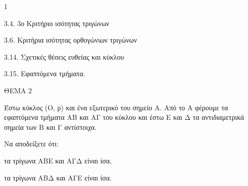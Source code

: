 \begin{ylh}{1}
    \item 3.4. 3ο Κριτήριο ισότητας τριγώνων
    \item 3.6. Κριτήρια ισότητας ορθογώνιων τριγώνων
    \item 3.14. Σχετικές θέσεις ευθείας και κύκλου
    \item 3.15. Εφαπτόμενα τμήματα.
\end{ylh}

ΘΕΜΑ 2

Έστω κύκλος (Ο, ρ) και ένα εξωτερικό του σημείο Α. Από το Α φέρουμε τα εφαπτόμενα τμήματα ΑΒ και ΑΓ του κύκλου και έστω Ε και Δ τα αντιδιαμετρικά σημεία των Β και Γ αντίστοιχα.

Να αποδείξετε ότι:

\begin{alist}
\item τα τρίγωνα ΑΒΕ και ΑΓΔ είναι ίσα, 

\item τα τρίγωνα ΑΒΔ και ΑΓΕ είναι ίσα. 


\begin{center}
\end{center}
\end{alist}
